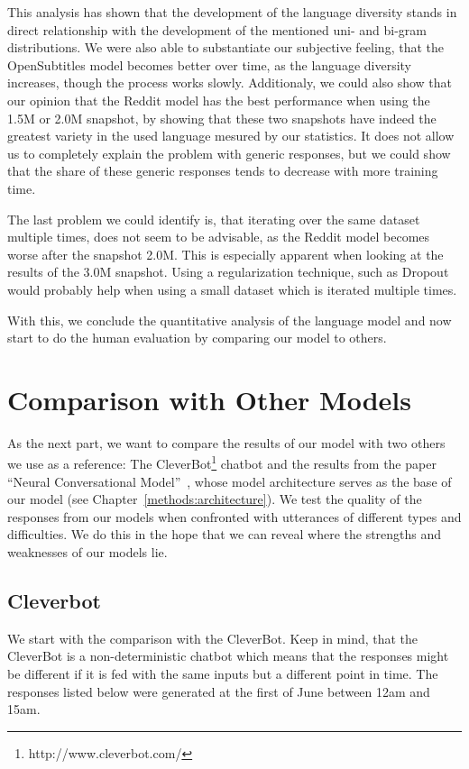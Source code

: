 This analysis has shown that the development of the language diversity stands in direct relationship with the development of the mentioned uni- and bi-gram distributions. We were also able to substantiate our subjective feeling, that the OpenSubtitles model becomes better over time, as the language diversity increases, though the process works slowly. Additionaly, we could also show that our opinion that the Reddit model has the best performance when using the 1.5M or 2.0M snapshot, by showing that these two snapshots have indeed the greatest variety in the used language mesured by our statistics. It does not allow us to completely explain the problem with generic responses, but we could show that the share of these generic responses tends to decrease with more training time.

The last problem we could identify is, that iterating over the same dataset multiple times, does not seem to be advisable, as the Reddit model becomes worse after the snapshot 2.0M. This is especially apparent when looking at the results of the 3.0M snapshot. Using a regularization technique, such as Dropout~\cite{Nitish:2014} would probably help when using a small dataset which is iterated multiple times.

With this, we conclude the quantitative analysis of the language model and now start to do the human evaluation by comparing our model to others.

\section{Comparison with Other Models}
As the next part, we want to compare the results of our model with two others we use as a reference: The CleverBot\footnote{http://www.cleverbot.com/} chatbot and the results from the paper ``Neural Conversational Model''~\cite{Vinyals:2015}, whose model architecture serves as the base of our model (see Chapter~\ref{methods:architecture}). We test the quality of the responses from our models when confronted with utterances of different types and difficulties. We do this in the hope that we can reveal where the strengths and weaknesses of our models lie.

\subsection{Cleverbot}
\label{results:comparison:cleverbot}
We start with the comparison with the CleverBot. Keep in mind, that the CleverBot is a non-deterministic chatbot which means that the responses might be different if it is fed with the same inputs but a different point in time. The responses listed below were generated at the first of June between 12am and 15am.

